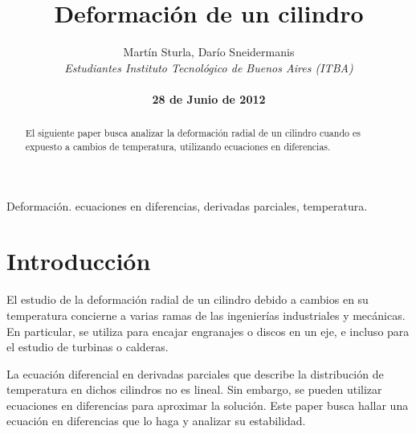 ﻿\documentclass[%
final,
%
reprint,
%
notitlepage,
narroweqnarray,
inline,
twoside,
invited
]{ieee}
\begin{document}
\title[Deformación de un cilindro]{%
Deformación de un cilindro}

\author[Sturla, Sneidermanis]{Martín Sturla, Darío Sneidermanis\\\textit{Estudiantes 
       Instituto Tecnológico de Buenos Aires (ITBA)}\\
\\\textbf{28 de Junio de 2012}
}



\lognumber{}
\pubitemident{}


\maketitle               

\begin{abstract} 
El siguiente paper busca analizar la deformación radial de un cilindro cuando 
es expuesto a cambios de temperatura, utilizando ecuaciones en diferencias.
\end{abstract}

\begin{keywords}
Deformación. ecuaciones en diferencias, derivadas parciales, temperatura.
\end{keywords}

\section{Introducción}

\par El estudio de la deformación radial de un cilindro debido a cambios en su temperatura concierne a 
varias ramas de las ingenierías industriales y mecánicas. En particular, se utiliza para encajar 
engranajes o discos en un eje, e incluso para el estudio de turbinas o calderas. 
\par La ecuación diferencial en derivadas parciales que describe la distribución de temperatura 
en dichos cilindros no es lineal. Sin embargo, se pueden utilizar ecuaciones en diferencias 
para aproximar la solución. Este paper busca hallar una ecuación en diferencias que lo haga 
y analizar su estabilidad. 
\end{document}
